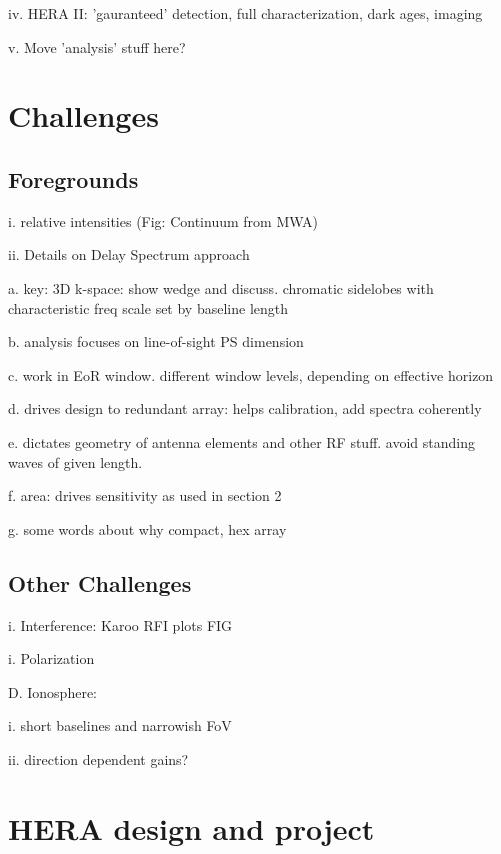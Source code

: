 \documentclass[preprint]{aastex}
\begin{document}
iv. HERA II: 'gauranteed' detection, full characterization, dark ages, imaging

v. Move 'analysis' stuff here?


\section{Challenges} %

\subsection{Foregrounds}  %

i. relative intensities (Fig: Continuum from MWA)

ii. Details on Delay Spectrum approach

a. key: 3D k-space: show wedge and discuss. chromatic sidelobes with characteristic freq scale 
set by baseline length

b. analysis focuses on line-of-sight PS dimension

c. work in EoR window.  different window levels, depending on effective horizon

d. drives design to redundant array: helps calibration, add spectra coherently

e. dictates geometry of antenna elements and other RF stuff. avoid standing waves of given length. 

f. area: drives sensitivity as used in section 2

g. some words about why compact, hex array 

\subsection{Other Challenges} %

i. Interference: Karoo RFI plots  FIG 

i. Polarization 

D. Ionosphere: 

i. short baselines and narrowish FoV

ii. direction dependent gains?


\section{HERA design and project} %
\end{document}
